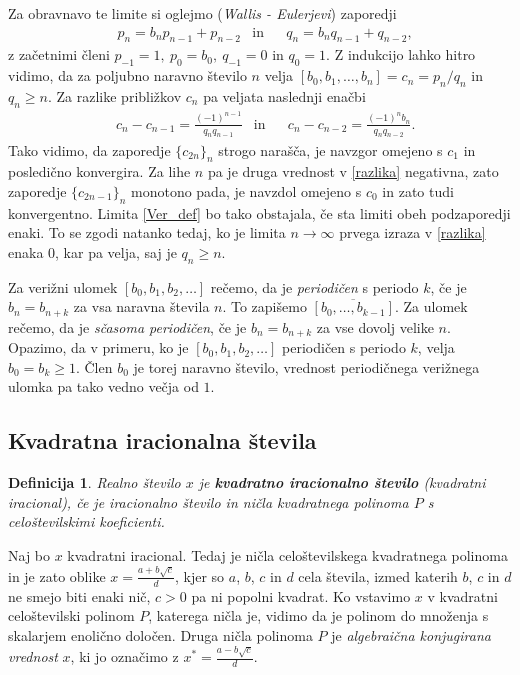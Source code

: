 \documentclass[a4paper,12pt]{article}
\newtheorem{definicija}{Definicija}
\begin{document}
Za obravnavo te limite si oglejmo (\emph{Wallis - Eulerjevi}) zaporedji
\begin{align*}
    &p_n = b_np_{n-1} + p_{n-2} 
    &\text{in}& 
    &q_n = b_nq_{n-1} + q_{n-2},
\end{align*}
z začetnimi členi $p_{-1} = 1,\ p_0 = b_0,\ q_{-1} = 0$ in $q_0 = 1$. Z indukcijo lahko hitro vidimo, da za poljubno naravno število $n$ velja $[b_0, b_1, \ldots, b_n] = c_n = p_n/q_n$ in $q_n \geq n$. Za razlike približkov $c_n$ pa veljata naslednji enačbi
\begin{align}
    \label{razlika}
    &c_n - c_{n-1} = \frac{(-1)^{n-1}}{q_nq_{n-1}}
    &\text{in}&
    &c_n - c_{n-2} = \frac{(-1)^nb_n}{q_nq_{n-2}}.
\end{align}
Tako vidimo, da zaporedje $\{c_{2n}\}_n$ strogo narašča, je navzgor omejeno s $c_1$ in posledično konvergira. Za lihe $n$ pa je druga vrednost v \eqref{razlika} negativna, zato zaporedje $\{c_{2n-1}\}_n$ monotono pada, je navzdol omejeno s $c_0$ in zato tudi konvergentno. Limita \eqref{Ver_def} bo tako obstajala, če sta limiti obeh podzaporedji enaki. To se zgodi natanko tedaj, ko je limita $n \to \infty$ prvega izraza v \eqref{razlika} enaka $0$, kar pa velja, saj je $q_n \geq n$.

Za verižni ulomek $[b_0, b_1, b_2, \ldots]$ rečemo, da je \emph{periodičen} s periodo $k$, če je $b_n = b_{n+k}$ za vsa naravna števila $n$. To zapišemo $\overline{[b_0, \ldots, b_{k-1}]}$.
Za ulomek rečemo, da je \emph{sčasoma periodičen}, če je $b_n = b_{n+k}$ za vse dovolj velike $n$. Opazimo, da v primeru, ko je $[b_0, b_1, b_2, \ldots]$ periodičen s periodo $k$, velja $b_0 = b_k \geq 1$. Člen $b_0$ je torej naravno število, vrednost periodičnega verižnega ulomka pa tako vedno večja od $1$. 


\subsection{Kvadratna iracionalna števila}

\begin{definicija}
	Realno število $x$ je \textbf{kvadratno iracionalno število} (kvadratni iracional), če je iracionalno število in ničla kvadratnega polinoma $P$ s celoštevilskimi koeficienti.
\end{definicija}
Naj bo $x$ kvadratni iracional. Tedaj je ničla celoštevilskega kvadratnega polinoma in je zato oblike $x = \frac{a + b\sqrt{c}}{d}$, kjer so $a$, $b$, $c$ in $d$ cela števila, izmed katerih $b$, $c$ in $d$ ne smejo biti enaki nič, $c > 0$ pa ni popolni kvadrat. Ko vstavimo $x$ v kvadratni celoštevilski polinom $P$, katerega ničla je, vidimo da je polinom do množenja s skalarjem enolično določen.
Druga ničla polinoma $P$ je \emph{algebraična konjugirana vrednost} $x$, ki jo označimo z $x^* = \frac{a - b\sqrt{c}}{d}$.
\end{document}
